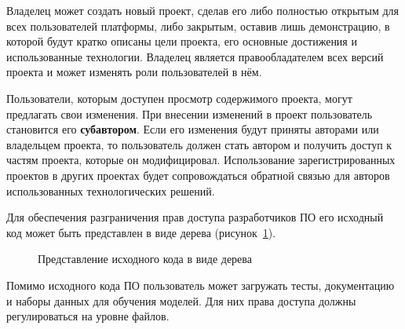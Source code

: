 \documentclass{bmstu}
\begin{document}
  Владелец может создать новый проект, сделав его либо полностью
  открытым для всех пользователей платформы, либо закрытым, оставив
  лишь демонстрацию, в которой будут кратко описаны цели проекта, его
  основные достижения и использованные технологии.
  Владелец является правообладателем всех версий проекта и может
  изменять роли пользователей в нём.

  Пользователи, которым доступен просмотр содержимого проекта, могут
  предлагать свои изменения.
  При внесении изменений в проект пользователь становится его
  \textbf{субавтором}.
  Если его изменения будут приняты авторами или владельцем проекта, то
  пользователь должен стать автором и получить доступ к частям
  проекта, которые он модифицировал.
  Использование зарегистрированных проектов в других проектах будет
  сопровождаться обратной связью для авторов использованных
  технологических решений.

  Для обеспечения разграничения прав доступа разработчиков ПО его
  исходный код может быть представлен в виде дерева
  (рисунок~\ref{fig:source-code-tree}).

  \begin{figure}[ht]
    \centering


    \caption{Представление исходного кода в виде дерева}
    \label{fig:source-code-tree}
  \end{figure}

  Помимо исходного кода ПО пользователь может загружать тесты,
  документацию и наборы данных для обучения моделей.
  Для них права доступа должны регулироваться на уровне файлов.
\end{document}
